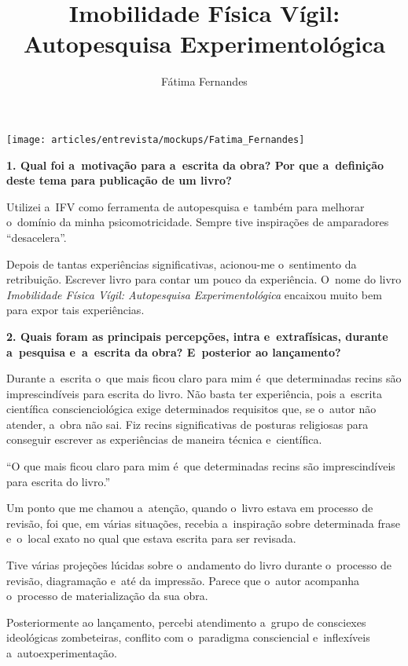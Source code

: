 \documentclass{gescons}
\author{Fátima Fernandes}
\title{Imobilidade Física Vígil: Autopesquisa Experimentológica}
\begin{document}
    \makeentrevistatitle

    \begin{multicols}{2}

\begin{center}
    \texttt{[image: articles/entrevista/mockups/Fatima\_Fernandes]}
\end{center}


\textbf{1. Qual foi a~motivação para a~escrita da obra? Por que a~definição deste tema para publicação de um livro?}

Utilizei a~IFV como ferramenta de autopesquisa e~também para melhorar o~domínio da minha psicomotricidade. Sempre tive inspirações de amparadores ``desacelera''.

Depois de tantas experiências significativas, acionou-me o~sentimento da retribuição. Escrever livro para contar um pouco da experiência. O~nome do livro \emph{Imobilidade Física Vígil: Autopesquisa Experimentológica} encaixou muito bem para expor tais experiências.


\textbf{2. Quais foram as principais percepções, intra e~extrafísicas, durante a~pesquisa e~a~escrita da obra? E~posterior ao lançamento?}

Durante a~escrita o~que mais ficou claro para mim é~que determinadas recins são imprescindíveis para escrita do livro. Não basta ter experiência, pois a~escrita científica conscienciológica exige determinados requisitos que, se o~autor não atender, a~obra não sai. Fiz recins significativas de posturas religiosas para conseguir escrever as experiências de maneira técnica e~científica.

\begin{pullquote}
``O  que mais ficou claro para mim é~que determinadas recins são imprescindíveis para escrita do livro.''
\end{pullquote}

Um ponto que me chamou a~atenção, quando o~livro estava em processo de revisão, foi que, em várias situações, recebia a~inspiração sobre determinada frase e~o~local exato no qual que estava escrita para ser revisada.

Tive várias projeções lúcidas sobre o~andamento do livro durante o~processo de revisão, diagramação e~até da impressão. Parece que o~autor acompanha o~processo de materialização da sua obra.

Posteriormente ao lançamento, percebi atendimento a~grupo de consciexes ideológicas zombeteiras, conflito com o~paradigma consciencial e~inflexíveis a~autoexperimentação.


\end{multicols}
\end{document}
